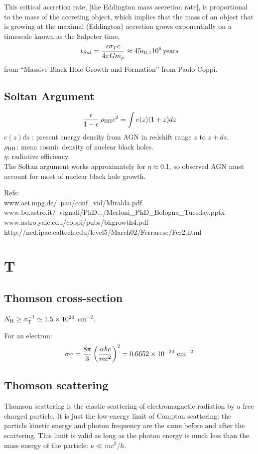 \documentclass[11pt]{article}
\begin{document}
This critical accretion rate, [the Eddington mass accretion rate], is proportional to the mass of the accreting object, which implies that the mass of an object that is growing at the maximal (Eddington) accretion grows exponentially on a timescale known as the Salpeter time,
\begin{equation}
  t_{Sal} = \frac{\epsilon \sigma_{T} c}{4\pi G m_{p}} \approx 45 \epsilon_{0.1} 10^6 \, {\rm years}
\end{equation}
from ``Massive Black Hole Growth and Formation'' from Paolo Coppi. 


\subsection{Soltan Argument}
\begin{equation}
  \frac{\epsilon}{1-\epsilon} \, \rho_{\rm BH} c^{2} = \int e(z) (1+z) dz
\end{equation}
$e(z) dz$ : present energy density from AGN in redshift range $z$ to $z+dz$.\\
$\rho_{\rm BH}$: mean cosmic density of nuclear black holes.\\
$\eta$: radiative efficiency\\
The Soltan argument works approximately for $\eta\approx$0.1, 
so observed AGN must account for most of nuclear black hole growth.

Refs:\\
www.aei.mpg.de/~pau/conf\_vid/Miralda.pdf\\
www.bo.astro.it/~vignali/PhD.../Merloni\_PhD\_Bologna\_Tuesday.pptx
www.astro.yale.edu/coppi/pubs/bhgrowth4.pdf
http://ned.ipac.caltech.edu/level5/March02/Ferrarese/Fer2.html

\section{T} 
\subsection{Thomson cross-section}
$N_{\rm H} \geq \sigma_{\rm T}^{-1} \simeq 1.5 \times 10^{24}$ cm$^{-2}$. 

For an electron:
\begin{equation}
\sigma_{\rm T}= \frac{8\pi}{3} \left(\frac{\alpha\hbar c}{mc^2}\right)^2 = 0.6652\times10^{-24} \,\, \rm{cm}^{-2}
\end{equation}

\subsection{Thomson scattering} 
Thomson scattering is the elastic scattering of electromagnetic radiation by a free charged particle. It is just the low-energy limit of Compton scattering: the particle kinetic energy and photon frequency are the same before and after the scattering. This limit is valid as long as the photon energy is much less than the mass energy of the particle: $\nu\ll mc^2/h$.



\end{document}
